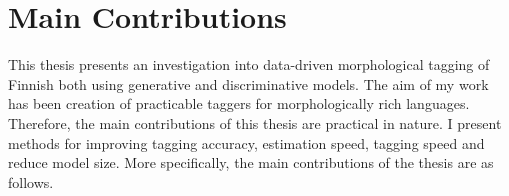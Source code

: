 
\section{Main Contributions}

This thesis presents an investigation into data-driven morphological
tagging of Finnish both using generative and discriminative
models. The aim of my work has been creation of practicable taggers
for morphologically rich languages. Therefore, the main contributions
of this thesis are practical in nature. I present methods for
improving tagging accuracy, estimation speed, tagging speed and reduce
model size. More specifically, the main contributions of the thesis
are as follows.

